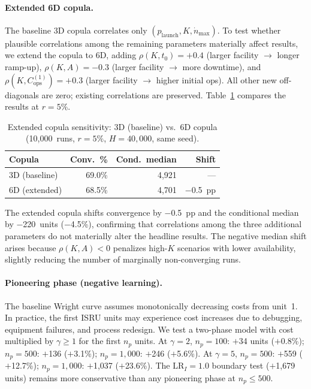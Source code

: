 \documentclass[preprint,12pt]{elsarticle}
\begin{document}
\paragraph{Extended 6D copula.} The baseline 3D copula correlates only $(p_{\mathrm{launch}}, K, \dot{n}_{\max})$. To test whether plausible correlations among the remaining parameters materially affect results, we extend the copula to 6D, adding $\rho(K, t_0) = +0.4$ (larger facility $\to$ longer ramp-up), $\rho(K, A) = -0.3$ (larger facility $\to$ more downtime), and $\rho(K, C_{\mathrm{ops}}^{(1)}) = +0.3$ (larger facility $\to$ higher initial ops). All other new off-diagonals are zero; existing correlations are preserved. Table~\ref{tab:copula_6d} compares the results at $r = 5\%$.

\begin{table}[htbp]
\centering
\caption{Extended copula sensitivity: 3D (baseline) vs.\ 6D copula (10{,}000~runs, $r = 5\%$, $H = 40{,}000$, same seed).}
\label{tab:copula_6d}
\small
\begin{tabular}{@{}lrrr@{}}
\toprule
Copula & Conv.\ \% & Cond.\ median & Shift \\
\midrule
3D (baseline) & 69.0\% & 4{,}921 & --- \\
6D (extended) & 68.5\% & 4{,}701 & $-$0.5~pp \\
\bottomrule
\end{tabular}
\end{table}

The extended copula shifts convergence by $-$0.5~pp and the conditional median by $-$220~units ($-$4.5\%), confirming that correlations among the three additional parameters do not materially alter the headline results. The negative median shift arises because $\rho(K, A) < 0$ penalizes high-$K$ scenarios with lower availability, slightly reducing the number of marginally non-converging runs.

\paragraph{Pioneering phase (negative learning).} The baseline Wright curve assumes monotonically decreasing costs from unit~1. In practice, the first ISRU units may experience cost increases due to debugging, equipment failures, and process redesign. We test a two-phase model with cost multiplied by $\gamma \geq 1$ for the first $n_p$ units. At $\gamma = 2$, $n_p = 100$: $+$34 units ($+$0.8\%); $n_p = 500$: $+$136 ($+$3.1\%); $n_p = 1{,}000$: $+$246 ($+$5.6\%). At $\gamma = 5$, $n_p = 500$: $+$559 ($+$12.7\%); $n_p = 1{,}000$: $+$1{,}037 ($+$23.6\%). The $\mathrm{LR}_I = 1.0$ boundary test ($+$1{,}679 units) remains more conservative than any pioneering phase at $n_p \leq 500$.
\end{document}
